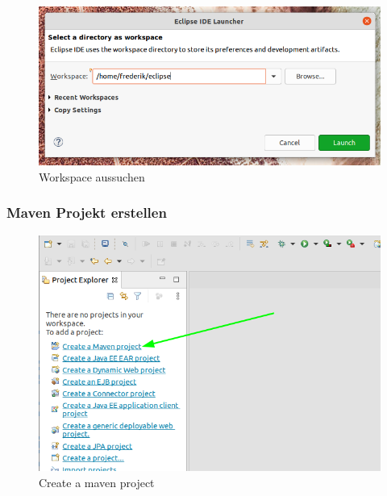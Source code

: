 \documentclass[11pt]{scrartcl}
\begin{document}
\begin{figure}[!ht]
    \includegraphics[width=\linewidth]{images/eclipse01_workspace.png}
    \caption{Workspace aussuchen}
    \label{fig:workspace}
\end{figure}

\newpage
\subsubsection{Maven Projekt erstellen}
\label{sec:mavenprojekterstellen}
\begin{figure}[!ht]
    \includegraphics[width=\linewidth]{images/eclipse02_create_maven.png}
    \caption{Create a maven project}
    \label{fig:createmaven}
\end{figure}
\end{document}
